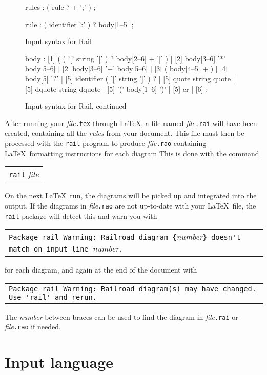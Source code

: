 \documentclass[a4paper]{article}
\newcommand\Rail{Rail}
\newcommand\nt[1]{\textit{#1}}
\newcommand\file[1]{\textit{file}\texttt{.#1}}
\newcommand\lit[1]{\texttt{#1}}
\newenvironment{example}%
{\begin{trivlist}\item[]\begin{tabular}{l}}%
{\end{tabular}\end{trivlist}}
\begin{document}
\begin{figure}
\begin{rail}

rules	: ( rule ? + ';' ) ;

rule	: ( identifier ':' ) ? body[1--5] ;

\end{rail}
\caption{Input syntax for \Rail}
\label{rules}
\end{figure}

\begin{figure}
\begin{rail}

body	: [1] ( ( '[' string ']' ) ? body[2--6] + '|' )
	| [2] body[3--6] '*' body[5--6]
	| [2] body[3--6] '+' body[5--6]
	| [3] ( body[4--5] + )
	| [4] body[5] '?'
	| [5] identifier ( '[' string ']' ) ?
	| [5] quote string quote
	| [5] dquote string dquote
	| [5] '(' body[1--6] ')'
	| [5] cr
	| [6]
	;

\end{rail}
\caption{Input syntax for \Rail, continued}
\label{body}
\end{figure}

After running your \file{tex} through \LaTeX, a file named \file{rai} will
have been created, containing all the \nt{rules} from your document.
This file must then be processed with the \lit{rail} program to produce
\file{rao} containing \LaTeX\ formatting instructions for each diagram
This is done with the command
\begin{example}
\texttt{rail} \textit{file}
\end{example}
On the next \LaTeX\ run, the diagrams will be picked up and integrated
into the output.
If the diagrams in \file{rao} are not up-to-date with your \LaTeX\ file,
the \lit{rail} package will detect this and warn you with
\begin{example}
\verb!Package rail Warning: Railroad diagram {!\nt{number}\verb!} doesn't match on input line !\nt{number}\verb!.!
\end{example}
for each diagram, and again at the end of the document with
\begin{example}
\verb!Package rail Warning: Railroad diagram(s) may have changed. Use 'rail' and rerun.!
\end{example}
The \nt{number} between braces can be used to find the diagram in
\file{rai} or \file{rao} if needed.

\section{Input language}
\end{document}
